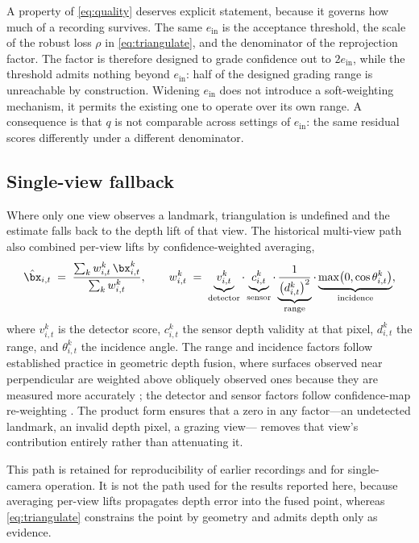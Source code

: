 A property of \eqref{eq:quality} deserves explicit statement, because it
governs how much of a recording survives. The same $e_{\text{in}}$ is the
acceptance threshold, the scale of the robust loss $\rho$ in
\eqref{eq:triangulate}, and the denominator of the reprojection factor. The
factor is therefore designed to grade confidence out to $2 e_{\text{in}}$,
while the threshold admits nothing beyond $e_{\text{in}}$: half of the designed
grading range is unreachable by construction. Widening $e_{\text{in}}$ does not
introduce a soft-weighting mechanism, it permits the existing one to operate
over its own range. A consequence is that $q$ is not comparable across settings
of $e_{\text{in}}$: the same residual scores differently under a different
denominator.

\subsection{Single-view fallback}

Where only one view observes a landmark, triangulation is undefined and the
estimate falls back to the depth lift of that view. The historical multi-view
path also combined per-view lifts by confidence-weighted averaging,
\begin{equation}
  \hat{\bx}_{i,t} \;=\;
  \frac{\sum_{k} w^{k}_{i,t}\, \bx^{k}_{i,t}}
       {\sum_{k} w^{k}_{i,t}},
  \qquad
  w^{k}_{i,t} \;=\;
  \underbrace{v^{k}_{i,t}}_{\text{detector}}
  \cdot
  \underbrace{c^{k}_{i,t}}_{\text{sensor}}
  \cdot
  \underbrace{\frac{1}{\left(d^{k}_{i,t}\right)^{2}}}_{\text{range}}
  \cdot
  \underbrace{\max\!\left(0, \cos\theta^{k}_{i,t}\right)}_{\text{incidence}},
  \label{eq:fusion}
\end{equation}
where $v^{k}_{i,t}$ is the detector score, $c^{k}_{i,t}$ the sensor depth
validity at that pixel, $d^{k}_{i,t}$ the range, and $\theta^{k}_{i,t}$ the
incidence angle. The range and incidence factors follow established practice in
geometric depth fusion, where surfaces observed near perpendicular are weighted
above obliquely observed ones because they are measured more accurately
\cite{fusionpatent}; the detector and sensor factors follow confidence-map
re-weighting \cite{zeng}. The product form ensures that a zero in any
factor---an undetected landmark, an invalid depth pixel, a grazing view---
removes that view's contribution entirely rather than attenuating it.

This path is retained for reproducibility of earlier recordings and for
single-camera operation. It is not the path used for the results reported here,
because averaging per-view lifts propagates depth error into the fused point,
whereas \eqref{eq:triangulate} constrains the point by geometry and admits
depth only as evidence.

